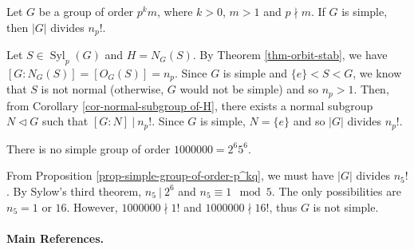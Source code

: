 \begin{proposition}\label{prop-simple-group-of-order-p^kq}
	Let $G$ be a group of order $p^km$, where $k > 0$, $m > 1$ and $p \nmid m$. If $G$ is simple, then $|G|$ divides $n_p!$.
\end{proposition}
\begin{sketch}
	Let $S \in \operatorname{Syl}_p(G)$ and $H = N_G(S)$. By Theorem \ref{thm-orbit-stab}, we have $[G:N_G(S)] = [O_G(S)] = n_p$. Since $G$ is simple and $\{e\} < S < G$, we know that $S$ is not normal (otherwise, $G$ would not be simple) and so $n_p > 1$. Then, from Corollary \ref{cor-normal-subgroup of-H}, there exists a normal subgroup $N \lhd G$ such that $[G:N] ~|~ n_p!$. Since $G$ is simple, $N = \{e\}$ and so $|G|$ divides $n_p!$.
\end{sketch}

\begin{corollary}
	There is no simple group of order $1000000 = 2^6 5^6$.
\end{corollary}
\begin{sketch}
	From Proposition \ref{prop-simple-group-of-order-p^kq}, we must have $|G|$ divides $n_5!$. By Sylow's third theorem, $n_5 ~|~ 2^6$ and $n_5 \equiv 1 \mod 5$. The only possibilities are $n_5 = 1$ or $16$. However, $1000000 \nmid 1!$ and $1000000 \nmid 16!$, thus $G$ is not simple.
\end{sketch}

\paragraph{Main References.} \cite{Hungerford1974,DummitFoote2004,Isaacs2009}
